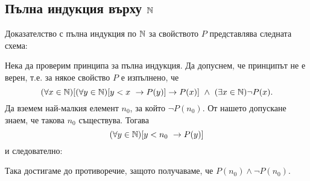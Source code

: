 \newpage 
\subsection*{Пълна индукция върху $\Nat$}

Доказателство с пълна индукция по $\Nat$ за свойството $P$ представлява следната схема:
\begin{prooftree}
\end{prooftree}
Нека да проверим принципа за пълна индукция.
Да допуснем, че принципът не е верен, т.е. за някое свойство $P$ е изпълнено, че
\[(\forall x\in\Nat)[(\forall y\in \Nat)[y < x\ \rightarrow P(y)]\rightarrow P(x)]\ \wedge\ (\exists x\in\Nat) \neg P(x).\]
Да вземем най-малкия елемент $n_0$, за който $\neg P(n_0)$. От нашето допускане знаем, че такова $n_0$ съществува.
Тогава \[(\forall y\in \Nat)[y < n_0\ \rightarrow P(y)]\]
и следователно:
\begin{prooftree}
\end{prooftree}
Така достигаме до противоречие, защото получаваме, че $P(n_0)\wedge \neg P(n_0)$.


